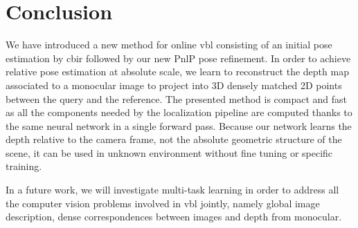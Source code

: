 \section{Conclusion}
\label{seq:conclusion}

We have introduced a new method for online \ac{vbl} consisting of an initial pose estimation by \ac{cbir} followed by our new PnlP pose refinement. In order to achieve relative pose estimation at absolute scale, we learn to reconstruct the depth map associated to a monocular image to project into 3D densely matched 2D points between the query and the reference. The presented method is compact and fast as all the components needed by the localization pipeline are computed thanks to the same neural network in a single forward pass. Because our network learns the depth relative to the camera frame, not the absolute geometric structure of the scene, it can be used in unknown environment without fine tuning or specific training. 

In a future work, we will investigate multi-task learning in order to address all the computer vision problems involved in \ac{vbl} jointly, namely global image description, dense correspondences between images and depth from monocular.